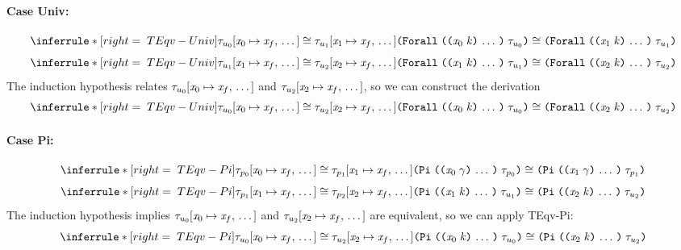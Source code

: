 \begin{sproof}
  \paragraph{Case {\sc Univ}:}
  \[\infr[TEqv-Univ]
  {\teqv
    {\seqsubst{\type_{u_0}}{\var_0}{\var_f}}
    {\seqsubst{\type_{u_1}}{\var_1}{\var_f}}}
  {\teqv
    {\typeuniv{\sequence{\notevar{\var_0}{\kind}}}{\type_{u_0}}}
    {\typeuniv{\sequence{\notevar{\var_1}{\kind}}}{\type_{u_1}}}}\]
  \ctrand
  \[\infr[TEqv-Univ]
  {\teqv
    {\seqsubst{\type_{u_1}}{\var_1}{\var_f}}
    {\seqsubst{\type_{u_2}}{\var_2}{\var_f}}}
  {\teqv
    {\typeuniv{\sequence{\notevar{\var_1}{\kind}}}{\type_{u_1}}}
    {\typeuniv{\sequence{\notevar{\var_2}{\kind}}}{\type_{u_2}}}}\]
  The induction hypothesis relates
  ${\mathit{\tau}_{u_0}\hspace{-2pt}\left[ \mathit{x}_0 \mapsto \mathit{x}_f, \, \ldots \, \right]}$ and ${\mathit{\tau}_{u_2}\hspace{-2pt}\left[ \mathit{x}_2 \mapsto \mathit{x}_f, \, \ldots \, \right]}$,
  so we can construct the derivation
  \[\infr[TEqv-Univ]
  {\teqv
    {\seqsubst{\type_{u_0}}{\var_0}{\var_f}}
    {\seqsubst{\type_{u_2}}{\var_2}{\var_f}}}
  {\teqv
    {\typeuniv{\sequence{\notevar{\var_0}{\kind}}}{\type_{u_0}}}
    {\typeuniv{\sequence{\notevar{\var_2}{\kind}}}{\type_{u_2}}}}\]
  \paragraph{Case {\sc Pi}:}
  \[\infr[TEqv-Pi]
  {\teqv
    {\seqsubst{\type_{p_0}}{\var_0}{\var_f}}
    {\seqsubst{\type_{p_1}}{\var_1}{\var_f}}}
  {\teqv
    {\typedprod{\sequence{\notevar{\var_0}{\sort}}}{\type_{p_0}}}
    {\typedprod{\sequence{\notevar{\var_1}{\sort}}}{\type_{p_1}}}}\]
  \ctrand
  \[\infr[TEqv-Pi]
  {\teqv
    {\seqsubst{\type_{p_1}}{\var_1}{\var_f}}
    {\seqsubst{\type_{p_2}}{\var_2}{\var_f}}}
  {\teqv
    {\typedprod{\sequence{\notevar{\var_1}{\kind}}}{\type_{u_1}}}
    {\typedprod{\sequence{\notevar{\var_2}{\kind}}}{\type_{u_2}}}}\]
  The induction hypothesis implies
  ${\mathit{\tau}_{u_0}\hspace{-2pt}\left[ \mathit{x}_0 \mapsto \mathit{x}_f, \, \ldots \, \right]}$ and ${\mathit{\tau}_{u_2}\hspace{-2pt}\left[ \mathit{x}_2 \mapsto \mathit{x}_f, \, \ldots \, \right]}$
  are equivalent,
  so we can apply {\sc TEqv-Pi}:
  \[\infr[TEqv-Pi]
  {\teqv
    {\seqsubst{\type_{u_0}}{\var_0}{\var_f}}
    {\seqsubst{\type_{u_2}}{\var_2}{\var_f}}}
  {\teqv
    {\typedprod{\sequence{\notevar{\var_0}{\kind}}}{\type_{u_0}}}
    {\typedprod{\sequence{\notevar{\var_2}{\kind}}}{\type_{u_2}}}}\]

\end{sproof}
